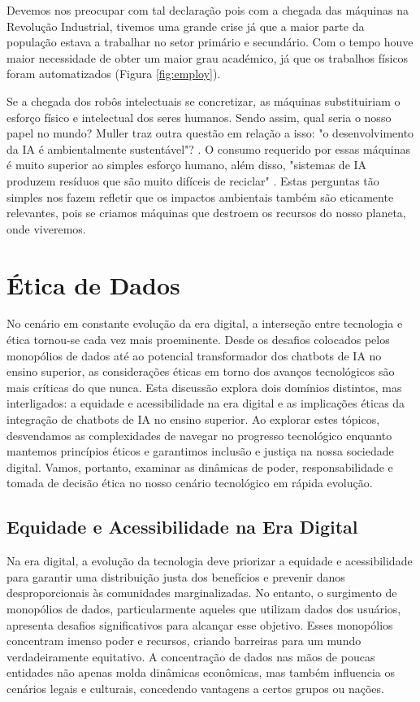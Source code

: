 \documentclass[referee,sn-basic]{sn-jnl}
\theoremstyle{thmstyleone}%
\begin{document}
Devemos nos preocupar com tal declaração pois com a chegada das máquinas na Revolução Industrial, tivemos uma grande crise já que a maior parte da população estava a trabalhar no setor primário e secundário. Com o tempo houve maior necessidade de obter um maior grau académico, já que os trabalhos físicos foram automatizados (Figura \ref{fig:employ}).

\hspace{0.7cm}Se a chegada dos robôs intelectuais se concretizar, as máquinas substituiriam o esforço físico e intelectual dos seres humanos. Sendo assim, qual seria o nosso papel no mundo? Muller traz outra questão em relação a isso: "o desenvolvimento da IA é ambientalmente sustentável"? \cite{sep-ethics-ai}. O consumo requerido por essas máquinas é muito superior ao simples esforço humano, além disso, "sistemas de IA produzem resíduos que são muito difíceis de reciclar" \cite{sep-ethics-ai}. Estas perguntas tão simples nos fazem refletir que os impactos ambientais também são eticamente relevantes, pois se criamos máquinas que destroem os recursos do nosso planeta, onde viveremos.


\section{Ética de Dados}

\hspace{0.7cm}No cenário em constante evolução da era digital, a interseção entre tecnologia e ética tornou-se cada vez mais proeminente. Desde os desafios colocados pelos monopólios de dados até ao potencial transformador dos chatbots de IA no ensino superior, as considerações éticas em torno dos avanços tecnológicos são mais críticas do que nunca. Esta discussão explora dois domínios distintos, mas interligados: a equidade e acessibilidade na era digital e as implicações éticas da integração de chatbots de IA no ensino superior. Ao explorar estes tópicos, desvendamos as complexidades de navegar no progresso tecnológico enquanto mantemos princípios éticos e garantimos inclusão e justiça na nossa sociedade digital. Vamos, portanto, examinar as dinâmicas de poder, responsabilidade e tomada de decisão ética no nosso cenário tecnológico em rápida evolução.

\subsection{Equidade e Acessibilidade na Era Digital}
\hspace{0.7cm}Na era digital, a evolução da tecnologia deve priorizar a equidade e acessibilidade para garantir uma distribuição justa dos benefícios e prevenir danos desproporcionais às comunidades marginalizadas. No entanto, o surgimento de monopólios de dados, particularmente aqueles que utilizam dados dos usuários, apresenta desafios significativos para alcançar esse objetivo. Esses monopólios concentram imenso poder e recursos, criando barreiras para um mundo verdadeiramente equitativo. A concentração de dados nas mãos de poucas entidades não apenas molda dinâmicas econômicas, mas também influencia os cenários legais e culturais, concedendo vantagens a certos grupos ou nações.
\end{document}

